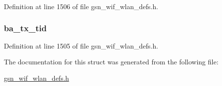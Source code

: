 Definition at line 1506 of file gsn\_\-wif\_\-wlan\_\-defs.h.

\hypertarget{a00365_a8443502fdd39f6ab5b4361996e34f7e3}{
\subsubsection[{ba\_\-tx\_\-tid}]{ {\bf ba\_\-tx\_\-tid}}}
\label{a00365_a8443502fdd39f6ab5b4361996e34f7e3}


Definition at line 1505 of file gsn\_\-wif\_\-wlan\_\-defs.h.



The documentation for this struct was generated from the following file:\begin{DoxyCompactItemize}
\item 
\hyperlink{a00613}{gsn\_\-wif\_\-wlan\_\-defs.h}\end{DoxyCompactItemize}
